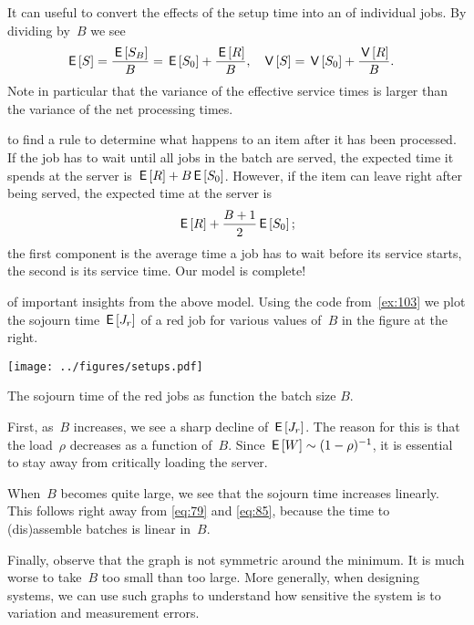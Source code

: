 \documentclass[stochastic-or.tex]{subfiles}
\begin{document}
It can useful to convert the effects of the setup time into an  of individual jobs.
By dividing by~$B$ we see
\begin{align}\label{eq:60}
  \,\mathsf{E}\left[S\right] &= \frac{\,\mathsf{E}\left[S_B\right]}{B} =  \,\mathsf{E}\left[S_0\right] + \frac{\,\mathsf{E}\left[R\right]} B , &  \,\mathsf{V}\left[S\right] &=  \,\mathsf{V}\left[S_0\right] + \frac{\,\mathsf{V}\left[R\right]}{B}.
\end{align}
Note in particular that the variance of the effective service times is larger than the variance of the net processing times.

 to find a rule to determine what happens to an item after it has been processed.
If the job has to wait until all jobs in the batch are served, the expected time it spends at the server is $\,\mathsf{E}\left[R\right] + B \,\mathsf{E}\left[S_0\right]$.
However, if the item can leave
right after being served, the expected time at the server is
\begin{equation}\label{eq:85}
\,\mathsf{E}\left[R\right] + \frac{B+1}{2}\,\mathsf{E}\left[S_0\right];
\end{equation}
the first component is the average time a job has to wait before its service starts, the second is its service time.
Our model is complete!



 of important insights from the above model.
Using the code from~\cref{ex:103} we plot the sojourn time $\,\mathsf{E}\left[J_r\right]$ of a red job for various values of~$B$ in the figure at the right.


\begin{marginfigure}
\texttt{[image: ../figures/setups.pdf]}
\caption{The sojourn time of the red jobs as function the batch size $B$.}
\label{fig:setups}
\end{marginfigure}

First, as~$B$ increases, we see a sharp decline of $\,\mathsf{E}\left[J_r\right]$.
The reason for this is that the load~$\rho$ decreases as a function of~$B$.
Since $\,\mathsf{E}\left[W\right] \sim (1-\rho)^{-1}$, it is essential to stay away from critically loading the server.


When~$B$ becomes quite large, we see that the sojourn time  increases linearly.
This follows right away from \cref{eq:79} and \cref{eq:85}, because the time to (dis)assemble batches is  linear in~$B$.

Finally, observe that the graph is not symmetric around the minimum.
It is much worse to take~$B$ too small than too large.
More generally, when designing systems, we can use such graphs to understand how sensitive the system is to variation and measurement errors.
\end{document}

